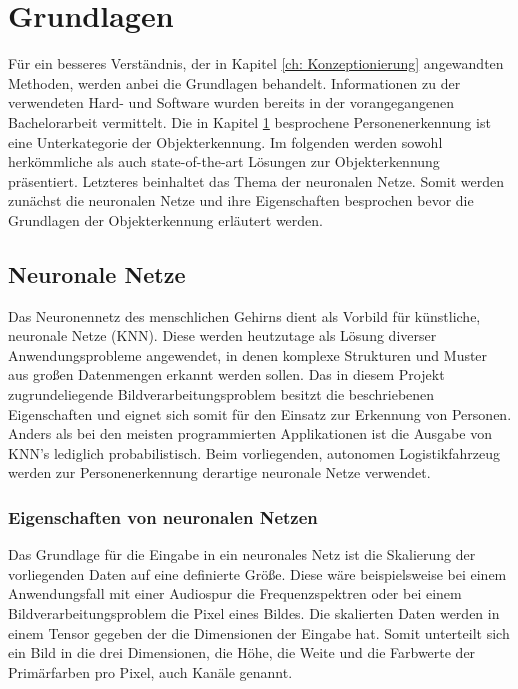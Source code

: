 \chapter{Grundlagen}
\label{ch: Grundlagen}
	Für ein besseres Verständnis, der in Kapitel \ref{ch: Konzeptionierung} angewandten Methoden, werden anbei die Grundlagen behandelt. Informationen zu der verwendeten Hard- und Software wurden bereits in der vorangegangenen Bachelorarbeit vermittelt. Die in Kapitel \ref{ch: Grundlagen} besprochene Personenerkennung ist eine Unterkategorie der Objekterkennung. Im folgenden werden sowohl herkömmliche als auch state-of-the-art Lösungen zur Objekterkennung präsentiert. Letzteres beinhaltet das Thema der neuronalen Netze. Somit werden zunächst die neuronalen Netze und ihre Eigenschaften besprochen bevor die Grundlagen der Objekterkennung erläutert werden.  
 
	
 	\section{Neuronale Netze}
	\label{sec: ROS}
	
	Das Neuronennetz des menschlichen Gehirns dient als Vorbild für künstliche, neuronale Netze (KNN). Diese werden heutzutage als Lösung diverser Anwendungsprobleme angewendet, in denen komplexe Strukturen und Muster aus großen Datenmengen erkannt werden sollen. Das in diesem Projekt zugrundeliegende Bildverarbeitungsproblem besitzt die beschriebenen Eigenschaften und eignet sich somit für den Einsatz zur Erkennung von Personen. Anders als bei den meisten programmierten Applikationen ist die Ausgabe von KNN's lediglich probabilistisch. Beim vorliegenden, autonomen Logistikfahrzeug werden zur Personenerkennung derartige neuronale Netze verwendet.
	
		\subsection{Eigenschaften von neuronalen Netzen}
		\label{subsec: Eigenschaften von neuronalen Netzen}
		Das Grundlage für die Eingabe in ein neuronales Netz ist die Skalierung der vorliegenden Daten auf eine definierte Größe. Diese wäre beispielsweise bei einem Anwendungsfall mit einer Audiospur die Frequenzspektren oder bei einem Bildverarbeitungsproblem die Pixel eines Bildes. Die skalierten Daten werden in einem Tensor gegeben der die Dimensionen der Eingabe hat. Somit unterteilt sich ein Bild in die drei Dimensionen, die Höhe, die Weite und die Farbwerte der Primärfarben pro Pixel, auch Kanäle genannt.\\
		
